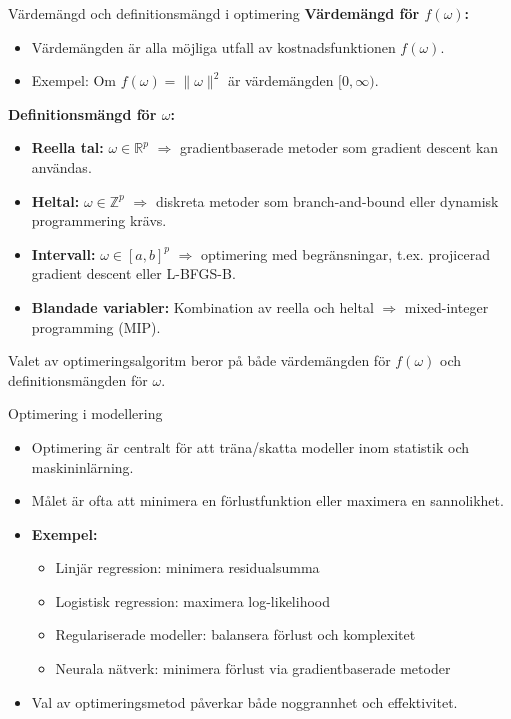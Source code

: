 \documentclass[10pt,english]{beamer}
\begin{document}
\begin{frame}{Värdemängd och definitionsmängd i optimering}
    \textbf{Värdemängd för $f(\omega)$:}
    \begin{itemize}
        \item Värdemängden är alla möjliga utfall av kostnadsfunktionen $f(\omega)$.
        \item Exempel: Om $f(\omega) = \|\omega\|^2$ är värdemängden $[0, \infty)$.
    \end{itemize}

    \vspace{0.2cm}
    \textbf{Definitionsmängd för $\omega$:}
    \begin{itemize}
        \item \textbf{Reella tal:} $\omega \in \mathbb{R}^p$ $\Rightarrow$ gradientbaserade metoder som gradient descent kan användas.
        \item \textbf{Heltal:} $\omega \in \mathbb{Z}^p$ $\Rightarrow$ diskreta metoder som branch-and-bound eller dynamisk programmering krävs.
        \item \textbf{Intervall:} $\omega \in [a, b]^p$ $\Rightarrow$ optimering med begränsningar, t.ex. projicerad gradient descent eller L-BFGS-B.
        \item \textbf{Blandade variabler:} Kombination av reella och heltal $\Rightarrow$ mixed-integer programming (MIP).
    \end{itemize}

    Valet av optimeringsalgoritm beror på både värdemängden för $f(\omega)$ och definitionsmängden för $\omega$.
\end{frame}

\begin{frame}{Optimering i modellering}
  \begin{itemize}
    \item Optimering är centralt för att träna/skatta modeller inom statistik och maskininlärning.
    \item Målet är ofta att minimera en förlustfunktion eller maximera en sannolikhet.
    \item \textbf{Exempel:}
    \begin{itemize}
      \item Linjär regression: minimera residualsumma
      \item Logistisk regression: maximera log-likelihood
      \item Regulariserade modeller: balansera förlust och komplexitet
      \item Neurala nätverk: minimera förlust via gradientbaserade metoder
    \end{itemize}
    \item Val av optimeringsmetod påverkar både noggrannhet och effektivitet.
  \end{itemize}
\end{frame}
\end{document}
